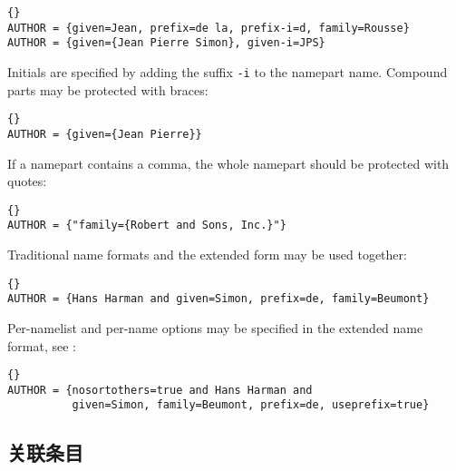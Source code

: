 \begin{lstlisting}[style=bibtex]{}
AUTHOR = {given=Jean, prefix=de la, prefix-i=d, family=Rousse}
AUTHOR = {given={Jean Pierre Simon}, given-i=JPS}
\end{lstlisting}
%
Initials are specified by adding the suffix \verb+-i+ to the namepart name.
Compound parts may be protected with braces:

\begin{lstlisting}[style=bibtex]{}
AUTHOR = {given={Jean Pierre}}
\end{lstlisting}
%
If a namepart contains a comma, the whole namepart should be protected with
quotes:

\begin{lstlisting}[style=bibtex]{}
AUTHOR = {"family={Robert and Sons, Inc.}"}
\end{lstlisting}
%
Traditional \bibtex name formats and the extended form may be used together:

\begin{lstlisting}[style=bibtex]{}
AUTHOR = {Hans Harman and given=Simon, prefix=de, family=Beumont}
\end{lstlisting}
%
Per-namelist and per-name options may be specified in the extended name
format, see :

\begin{lstlisting}[style=bibtex]{}
AUTHOR = {nosortothers=true and Hans Harman and
          given=Simon, family=Beumont, prefix=de, useprefix=true}
\end{lstlisting}
\subsection{关联条目}%
\label{use:rel}


